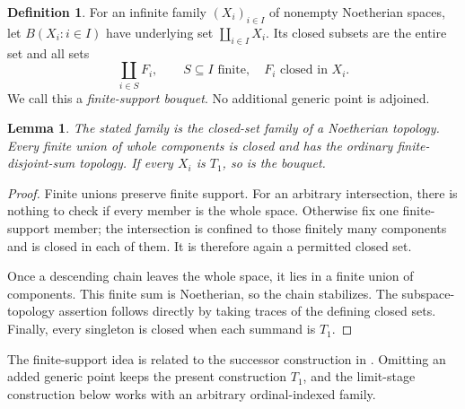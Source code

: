 \documentclass[11pt,a4paper]{article}
\newtheorem{lemma}[lemma]{Lemma}
\theoremstyle{definition}
\newtheorem{definition}[definition]{Definition}
\numberwithin{equation}{section}
\begin{document}
\begin{definition}\label{def:bouquet}
For an infinite family $(X_i)_{i\in I}$ of nonempty Noetherian spaces,
let $B(X_i:i\in I)$ have underlying set $\coprod_{i\in I}X_i$.
Its closed subsets are the entire set and all sets
\[
 \coprod_{i\in S}F_i,
 \qquad S\subseteq I\text{ finite},\quad F_i\text{ closed in }X_i.
\]
We call this a \emph{finite-support bouquet}.  No additional generic
point is adjoined.
\end{definition}

\begin{lemma}\label{lem:bouquet}
The stated family is the closed-set family of a Noetherian topology.
Every finite union of whole components is closed and has the ordinary
finite-disjoint-sum topology.  If every $X_i$ is $T_1$, so is the bouquet.
\end{lemma}
\begin{proof}
Finite unions preserve finite support.  For an arbitrary intersection,
there is nothing to check if every member is the whole space.  Otherwise
fix one finite-support member; the intersection is confined to those
finitely many components and is closed in each of them.  It is therefore
again a permitted closed set.

Once a descending chain leaves the whole space, it lies in a finite
union of components.  This finite sum is Noetherian, so the chain
stabilizes.  The subspace-topology assertion follows directly by taking
traces of the defining closed sets.  Finally, every singleton is closed
when each summand is $T_1$.
\end{proof}

The finite-support idea is related to the successor construction in
\cite[Example~11.9]{GL23}.  Omitting an added generic point keeps the
present construction $T_1$, and the limit-stage construction below works
with an arbitrary ordinal-indexed family.
\end{document}
